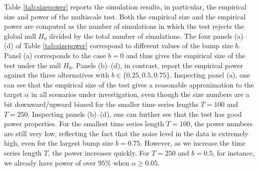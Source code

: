 \documentclass[12pt]{article}
\begin{document}
Table \ref{tab:sizepower} reports the simulation results, in particular, the empirical size and power of the multiscale test. Both the empirical size and the empirical power are computed as the number of simulations in which the test rejects the global null $H_0$ divided by the total number of simulations.
The four panels (a)--(d) of Table \ref{tab:sizepower} correspond to different values of the bump size $b$. Panel (a) corresponds to the case $b=0$ and thus gives the empirical size of the test under the null $H_0$. Panels (b)--(d), in contrast, report the empirical power against the three alternatives with $b \in \{0.25,0.5,0.75\}$.
Inspecting panel (a), one can see that the empirical size of the test gives a reasonable approximation to the target $\alpha$ in all scenarios under investigation, even though the size numbers are a bit downward/upward biased for the smaller time series lengths $T=100$ and $T=250$.
Inspecting panels (b)--(d), one can further see that the test has good power properties. For the smallest time series length $T=100$, the power numbers are still very low, reflecting the fact that the noise level in the data is extremely high, even for the largest bump size $b=0.75$. 
However, as we increase the time series length $T$, the power increases quickly. For $T=250$ and $b=0.5$, for instance, we already have power of over $95\%$ when $\alpha \ge 0.05$.
\end{document}

